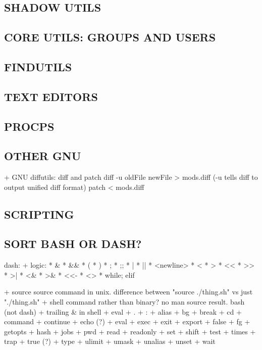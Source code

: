 \subsection{SHADOW UTILS}

\subsection{CORE UTILS: GROUPS AND USERS}

\subsection{FINDUTILS}

\subsection{TEXT EDITORS}

\subsection{PROCPS}

\subsection{OTHER GNU}

+ GNU diffutils: diff and patch
diff -u oldFile newFile > mods.diff  (-u tells diff to output unified diff format)
patch < mods.diff
\subsection{SCRIPTING}

\subsection{SORT BASH OR DASH?}


dash:
+ logic:
  * \&
  * \&\&
  * (
  * )
  * ;
  * ;;
  * |
  * ||
  * <newline>
  * <
  * >
  * <<
  * >>
  * >|
  * <\&
  * >\&
  * <<-
  * <>
  * while; elif

+ source
source command in unix. difference between "source ./thing.sh" vs just "./thing.sh"
+ shell command rather than binary? no man source result. bash (not dash)
+ trailing \& in shell
+ eval
+ .
+ :
+ alias
+ bg
+ break
+ cd
+ command
+ continue
+ echo (?)
+ eval
+ exec
+ exit
+ export
+ false
+ fg
+ getopts
+ hash
+ jobs
+ pwd
+ read
+ readonly
+ set
+ shift
+ test
+ times
+ trap
+ true (?)
+ type
+ ulimit
+ umask
+ unalias
+ unset
+ wait


